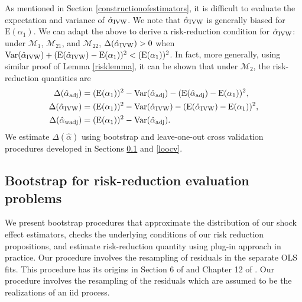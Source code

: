 \documentclass[11pt,3p,review,authoryear]{elsarticle}
\def\mc#1{\mathcal{#1}} %
\def\E#1{\mathrm{E}(#1)} %
\def\var#1{\mathrm{Var}(#1)} %
\theoremstyle{definition}
\begin{document}
As mentioned in Section \ref{constructionofestimators}, it is difficult to evaluate the expectation and variance of $\hat{\alpha}_{\rm IVW}$. We note that $\hat{\alpha}_{\rm IVW}$ is generally biased for $\E{\alpha_1}$. We can adapt the above to derive a risk-reduction condition for $\hat{\alpha}_{\rm IVW}$: under $\mc{M}_{1}$, $\mc{M}_{21}$, and $\mc{M}_{22}$, $\Delta(\hat\alpha_{\rm IVW}) > 0$ when $\var{\hat{\alpha}_{\rm IVW}} +(\E{\hat{\alpha}_{\rm IVW}}-\E{\alpha_1})^2<(\E{\alpha_1})^2$.  In fact, more generally, using similar proof of Lemma \ref{risklemma}, it can be shown that under $\mc{M}_2$, the risk-reduction quantities are
\begin{align*}
  \Delta(\hat{\alpha}_{\rm adj}) 
  &= (\E{\alpha_1})^2 -\var{\hat{\alpha}_{\rm adj}}-(\E{\hat{\alpha}_{\rm adj}}-\E{\alpha_1})^2,\\
  \Delta(\hat{\alpha}_{\rm IVW}) 
  &= (\E{\alpha_1})^2 -\var{\hat{\alpha}_{\rm IVW}}-(\E{\hat{\alpha}_{\rm IVW}}-\E{\alpha_1})^2 ,\\
  \Delta(\hat{\alpha}_{\rm wadj}) 
  &= (\E{\alpha_1})^2 -\var{\hat{\alpha}_{\rm adj}}.
\end{align*}
We estimate $\Delta(\hat{\alpha})$ using bootstrap and leave-one-out cross validation procedures developed in Sections \ref{varbootstrap} and \ref{loocv}. 
 


\subsection{Bootstrap for risk-reduction evaluation problems}
\label{varbootstrap}


We present bootstrap procedures that approximate the distribution of our shock effect estimators, checks the underlying conditions of our risk reduction propositions, and estimate risk-reduction quantity using plug-in approach in practice. Our procedure involves the resampling of residuals in the separate OLS fits. This procedure has its origins in Section 6 of \citet{efron1986bootstrap} and Chapter 12 of \cite{kilian2017structural}. Our procedure involves the resampling of the residuals which are assumed to be the realizations of an iid process.
\end{document}
